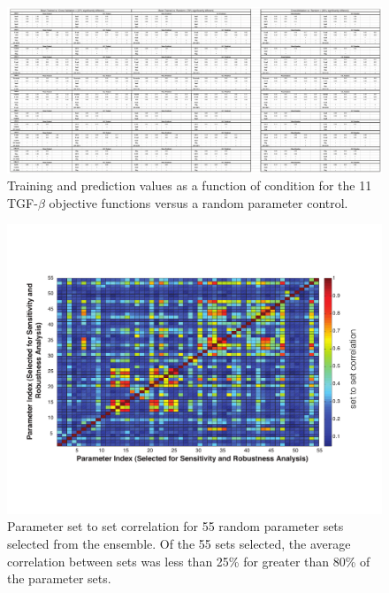 \documentclass[12pt]{article}
\begin{document}
\begin{figure}
\includegraphics [width=1.0\linewidth] {./figs/Fig-6-Supplemental-CompeteErrorTable.pdf}
\caption{Training and prediction values as a function of condition for the 11 TGF-$\beta$ objective functions versus a random parameter control.}\label{fig:S6}
\end{figure}

\begin{figure}
\includegraphics [width=1.0\linewidth] {./figs/Fig-7-Supplemental-Correlation.pdf}
\caption{Parameter set to set correlation for 55 random parameter sets selected from the ensemble.
Of the 55 sets selected, the average correlation between sets was less than 25\% for greater than 80\% of the parameter sets.}\label{fig:S7}
\end{figure}
\end{document}
